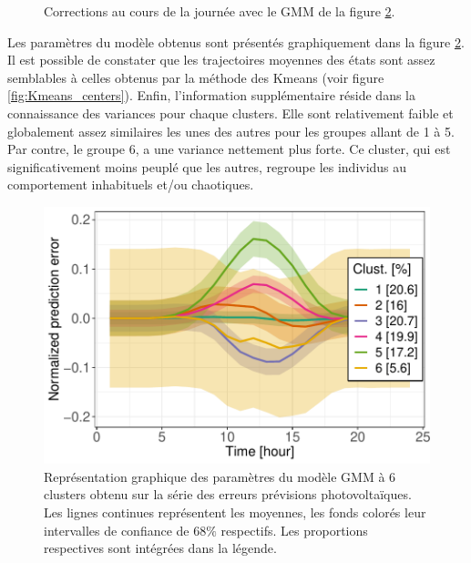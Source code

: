 \documentclass[12pt]{report}
\begin{document}
\begin{figure}[h]
	\caption{Corrections au cours de la journée avec le GMM de la figure \ref{fig:PV_GMM_MeanVarProp}. }
	\label{fig:PV_GMM_IntraDay} 
\end{figure}


Les paramètres du modèle obtenus sont présentés graphiquement dans la figure \ref{fig:PV_GMM_MeanVarProp}. Il est possible de constater que les trajectoires moyennes des états sont assez semblables à celles obtenus par la méthode des Kmeans (voir figure \ref{fig:Kmeans_centers}). Enfin, l'information supplémentaire réside dans la connaissance des variances pour chaque clusters. Elle sont relativement faible et globalement assez similaires les unes des autres pour les groupes allant de 1 à 5. Par contre, le groupe 6, a une variance nettement plus forte. Ce cluster, qui est significativement moins peuplé que les autres, regroupe les individus au comportement inhabituels et/ou chaotiques.

\begin{figure}[h]
	\centering
	\includegraphics[width = 0.75 \linewidth]{Images/PV/GMM/GMM_MeansVars_6_dim24.pdf}
	\caption{Représentation graphique des paramètres du modèle GMM à 6 clusters obtenu sur la série des erreurs prévisions photovoltaïques. Les lignes continues représentent les moyennes, les fonds colorés leur intervalles de confiance de $68 \%$ respectifs. Les proportions respectives sont intégrées dans la légende.}
	\label{fig:PV_GMM_MeanVarProp}
\end{figure}
\end{document}
